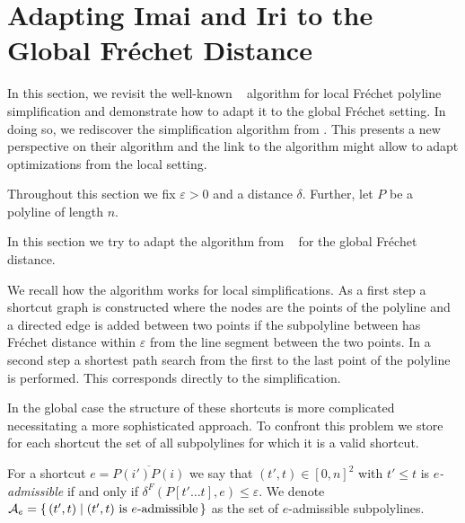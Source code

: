 \section{Adapting Imai and Iri to the Global Fréchet Distance}
\label{sec:global_imai_iri}

In this section, we revisit the well-known \citeauthor{computational_geometric_methods_for_polygonal_approximations_of_a_curve}~\cite{computational_geometric_methods_for_polygonal_approximations_of_a_curve} algorithm for local Fréchet polyline simplification and demonstrate how to adapt it to the global Fréchet setting. In doing so, we rediscover the simplification algorithm from \citeauthor{global_curve_simplification}. This presents a new perspective on their algorithm and the link to the \citeauthor{computational_geometric_methods_for_polygonal_approximations_of_a_curve} algorithm might allow to adapt optimizations from the local setting.

Throughout this section we fix \(\varepsilon > 0\) and a distance \(\delta\). Further, let \(P\) be a polyline of length \(n\).

In this section we try to adapt the algorithm from \citeauthor{computational_geometric_methods_for_polygonal_approximations_of_a_curve}~\cite{computational_geometric_methods_for_polygonal_approximations_of_a_curve} for the global Fréchet distance. 

We recall how the algorithm works for local simplifications. As a first step a shortcut graph is constructed where the nodes are the points of the polyline and a directed edge is added between two points if the subpolyline between has Fréchet distance within \(\varepsilon\) from the line segment between the two points. In a second step a shortest path search from the first to the last point of the polyline is performed. This corresponds directly to the simplification.

In the global case the structure of these shortcuts is more complicated necessitating a more sophisticated approach. To confront this problem we store for each shortcut the set of all subpolylines for which it is a valid shortcut. 

\begin{definition}
  For a shortcut \(e = \overline{P(i')P(i)}\) we say that \((t', t) \in [0, n]^2\) with \(t' \leq t\) is \emph{\(e\)-admissible} if and only if \(\delta^F(P[t' \dots t], e) \leq \varepsilon\). We denote \(\mathcal{A}_e = \set{(t', t) \mid (t', t) \textrm{ is } e\textrm{-admissible}}\) as the set of \(e\)-admissible subpolylines.
\end{definition}

